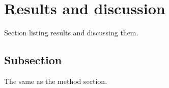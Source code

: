\section{Results and discussion}
Section listing results and discussing them. 


\subsection{Subsection}
The same as the method section. 
